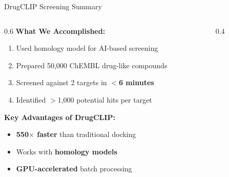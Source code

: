 \documentclass[aspectratio=169,xcolor=table]{beamer}
\begin{document}
\begin{frame}{DrugCLIP Screening Summary}
\begin{columns}
\begin{column}{0.6\textwidth}
\textbf{What We Accomplished:}
\begin{enumerate}\setlength{\itemsep}{2pt}
    \item Used homology model for AI-based screening
    \item Prepared 50,000 ChEMBL drug-like compounds
    \item Screened against 2 targets in \textbf{$<$6 minutes}
    \item Identified $>$1,000 potential hits per target
\end{enumerate}

\vspace{0.2cm}
\textbf{Key Advantages of DrugCLIP:}
\begin{itemize}\setlength{\itemsep}{0pt}
    \item \textcolor{druggreen}{\textbf{550$\times$ faster}} than traditional docking
    \item Works with \textbf{homology models}
    \item \textbf{GPU-accelerated} batch processing
\end{itemize}
\end{column}

\begin{column}{0.4\textwidth}
\end{column}
\end{columns}
\end{frame}
\end{document}
